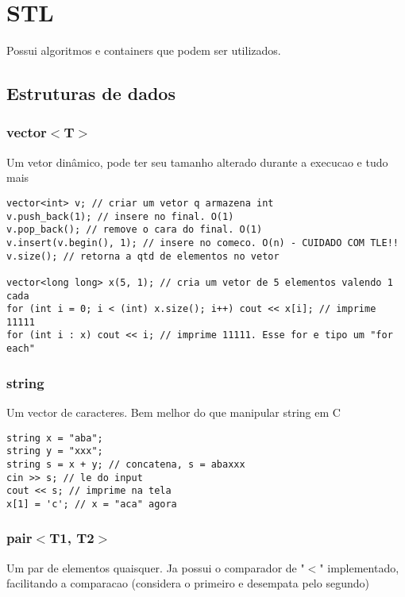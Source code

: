 
\chapter{STL}

Possui algoritmos e containers que podem ser utilizados.

\section{Estruturas de dados}

\subsection{vector$<$T$>$}

Um vetor dinâmico, pode ter seu tamanho alterado durante a execucao e tudo mais

\begin{lstlisting}
vector<int> v; // criar um vetor q armazena int
v.push_back(1); // insere no final. O(1)
v.pop_back(); // remove o cara do final. O(1)
v.insert(v.begin(), 1); // insere no comeco. O(n) - CUIDADO COM TLE!!
v.size(); // retorna a qtd de elementos no vetor

vector<long long> x(5, 1); // cria um vetor de 5 elementos valendo 1 cada
for (int i = 0; i < (int) x.size(); i++) cout << x[i]; // imprime 11111
for (int i : x) cout << i; // imprime 11111. Esse for e tipo um "for each"
\end{lstlisting}

\subsection{string}

Um vector de caracteres. Bem melhor do que manipular string em C

\begin{lstlisting}
string x = "aba";
string y = "xxx";
string s = x + y; // concatena, s = abaxxx
cin >> s; // le do input
cout << s; // imprime na tela
x[1] = 'c'; // x = "aca" agora
\end{lstlisting}

\subsection{pair$<$T1, T2$>$}

Um par de elementos quaisquer. Ja possui o comparador de "$<$" implementado, facilitando a comparacao (considera o primeiro e desempata pelo segundo)


